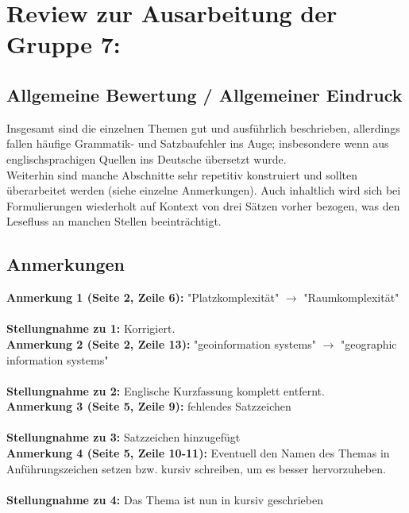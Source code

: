 \documentclass[a4paper,12pt]{book}
\begin{document}
\chapter*{Review zur Ausarbeitung der Gruppe 7:}

\section*{Allgemeine Bewertung / Allgemeiner Eindruck}
Insgesamt sind die einzelnen Themen gut und ausführlich beschrieben, allerdings fallen häufige Grammatik- und Satzbaufehler ins Auge; insbesondere wenn aus englischsprachigen Quellen ins Deutsche übersetzt wurde.\\
Weiterhin sind manche Abschnitte sehr repetitiv konstruiert und sollten überarbeitet werden (siehe einzelne Anmerkungen).
Auch inhaltlich wird sich bei Formulierungen wiederholt auf Kontext von drei Sätzen vorher bezogen, was den Lesefluss an manchen Stellen beeinträchtigt.

\section*{Anmerkungen}

\textbf{Anmerkung 1 (Seite 2, Zeile 6):}
"Platzkomplexität" $\rightarrow$ "Raumkomplexität"\\
\\
\textbf{Stellungnahme zu 1:}
Korrigiert.
\\

\noindent
\textbf{Anmerkung 2 (Seite 2, Zeile 13):}
"geoinformation systems" $\rightarrow$ "geographic information systems"\\
\\
\textbf{Stellungnahme zu 2:}
Englische Kurzfassung komplett entfernt.
\\

\noindent
\textbf{Anmerkung 3 (Seite 5, Zeile 9):}
fehlendes Satzzeichen
\\ \\
\textbf{Stellungnahme zu 3:}
Satzzeichen hinzugefügt
\\

\noindent
\textbf{Anmerkung 4 (Seite 5, Zeile 10-11):}
Eventuell den Namen des Themas in Anführungszeichen setzen bzw. kursiv schreiben, um es besser hervorzuheben.\\
\\
\textbf{Stellungnahme zu 4:}
Das Thema ist nun in kursiv geschrieben
\\
\end{document}

